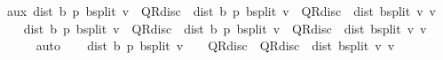 \begin{isabellebody}
\ aux{\isacharcolon}{\kern0pt}\ {\isachardoublequoteopen}dist\ {\isacharparenleft}{\kern0pt}{\isasymnu}\isactrlsub b\ {\isacharquery}{\kern0pt}p{\isacharparenright}{\kern0pt}\ {\isacharparenleft}{\kern0pt}{\isasymL}\isactrlsub b{\isacharunderscore}{\kern0pt}split\ v{\isacharparenright}{\kern0pt}\ {\isasymle}\ QR{\isacharunderscore}{\kern0pt}disc\ {\isacharasterisk}{\kern0pt}\ dist\ {\isacharparenleft}{\kern0pt}{\isasymnu}\isactrlsub b\ {\isacharquery}{\kern0pt}p{\isacharparenright}{\kern0pt}\ {\isacharparenleft}{\kern0pt}{\isasymL}\isactrlsub b{\isacharunderscore}{\kern0pt}split\ v{\isacharparenright}{\kern0pt}\ {\isacharplus}{\kern0pt}\ QR{\isacharunderscore}{\kern0pt}disc\ {\isacharasterisk}{\kern0pt}\ dist\ {\isacharparenleft}{\kern0pt}{\isasymL}\isactrlsub b{\isacharunderscore}{\kern0pt}split\ v{\isacharparenright}{\kern0pt}\ v{\isachardoublequoteclose}\ \isacommand{{\isachardot}{\kern0pt}}\isamarkupfalse%
\isanewline
\ \ \isamarkupfalse%
\ {\isachardoublequoteopen}dist\ {\isacharparenleft}{\kern0pt}{\isasymnu}\isactrlsub b\ {\isacharquery}{\kern0pt}p{\isacharparenright}{\kern0pt}\ {\isacharparenleft}{\kern0pt}{\isasymL}\isactrlsub b{\isacharunderscore}{\kern0pt}split\ v{\isacharparenright}{\kern0pt}\ {\isacharminus}{\kern0pt}\ QR{\isacharunderscore}{\kern0pt}disc\ {\isacharasterisk}{\kern0pt}\ dist\ {\isacharparenleft}{\kern0pt}{\isasymnu}\isactrlsub b\ {\isacharquery}{\kern0pt}p{\isacharparenright}{\kern0pt}\ {\isacharparenleft}{\kern0pt}{\isasymL}\isactrlsub b{\isacharunderscore}{\kern0pt}split\ v{\isacharparenright}{\kern0pt}\ {\isasymle}\ QR{\isacharunderscore}{\kern0pt}disc\ {\isacharasterisk}{\kern0pt}\ dist\ {\isacharparenleft}{\kern0pt}{\isasymL}\isactrlsub b{\isacharunderscore}{\kern0pt}split\ v{\isacharparenright}{\kern0pt}\ v{\isachardoublequoteclose}\isanewline
\ \ \ \ \isamarkupfalse%
\ auto\isanewline
\ \ \isamarkupfalse%
\ {\isachardoublequoteopen}dist\ {\isacharparenleft}{\kern0pt}{\isasymnu}\isactrlsub b\ {\isacharquery}{\kern0pt}p{\isacharparenright}{\kern0pt}\ {\isacharparenleft}{\kern0pt}{\isasymL}\isactrlsub b{\isacharunderscore}{\kern0pt}split\ v{\isacharparenright}{\kern0pt}\ {\isacharasterisk}{\kern0pt}\ {\isacharparenleft}{\kern0pt}{}\ {\isacharminus}{\kern0pt}\ QR{\isacharunderscore}{\kern0pt}disc{\isacharparenright}{\kern0pt}\ {\isasymle}\ QR{\isacharunderscore}{\kern0pt}disc\ {\isacharasterisk}{\kern0pt}\ dist\ {\isacharparenleft}{\kern0pt}{\isasymL}\isactrlsub b{\isacharunderscore}{\kern0pt}split\ v{\isacharparenright}{\kern0pt}\ v{\isachardoublequoteclose}\isanewline

\end{isabellebody}
